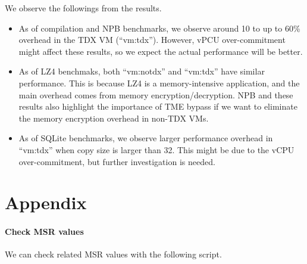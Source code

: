 \documentclass[letterpaper,twocolumn,10pt]{article}
\newcommand{\myparagraph}{\paragraph}
\begin{document}
We observe the followings from the results.
\begin{itemize}
    \item As of compilation and NPB benchmarks, we observe around 10 to up to 60\% overhead in the TDX VM (``vm:tdx''). However, vPCU over-commitment might affect these results, so we expect the actual performance will be better.
    \item As of LZ4 benchmaks, both ``vm:notdx'' and ``vm:tdx'' have similar performance. This is because LZ4 is a memory-intensive application, and the main overhead comes from memory encryption/decryption. NPB and these results also highlight the importance of TME bypass if we want to eliminate the memory encryption overhead in non-TDX VMs.
    \item As of SQLite benchmarks, we observe larger performance overhead in ``vm:tdx'' when copy size is larger than 32. This might be due to the vCPU over-commitment, but further investigation is needed.
\end{itemize}


\printbibliography

\section*{Appendix}

\myparagraph{Check MSR values}
We can check related MSR values with the following script.

\end{document}
